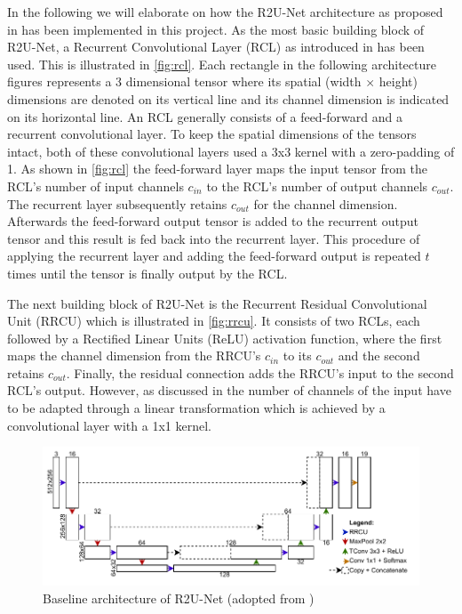 \documentclass{article}
\begin{document}
In the following we will elaborate on how the R2U-Net architecture as proposed 
in \autocite{R2UNet} has been implemented in this project. As the most basic 
building block of R2U-Net, a Recurrent Convolutional Layer
(RCL) as introduced in \autocite{RCNN} has been used. This is
illustrated in \autoref{fig:rcl}. Each rectangle in the following architecture 
figures represents a 3 dimensional tensor where its spatial (width $\times$ 
height) dimensions are denoted on its vertical line and its channel dimension 
is indicated on its horizontal line. An RCL generally consists of a 
feed-forward and a recurrent convolutional layer. To keep the spatial 
dimensions of the tensors intact, both of these convolutional layers used a 3x3 
kernel with a zero-padding of 1. As shown in \autoref{fig:rcl} the feed-forward 
layer maps the input tensor from the RCL's number of input channels $c_{in}$ to 
the 
RCL's number of output channels $c_{out}$. The recurrent layer subsequently 
retains $c_{out}$ for the channel dimension. Afterwards the feed-forward output 
tensor is added to the recurrent output tensor and this result is fed back into 
the recurrent layer. 
This procedure of applying the recurrent layer and adding the feed-forward 
output is repeated $t$ times until the tensor is finally output by the RCL. 
\autocite[4]{R2UNet}

The next building block of R2U-Net is the Recurrent Residual Convolutional Unit 
(RRCU) which is illustrated in \autoref{fig:rrcu}. It consists of two RCLs, 
each followed by a Rectified Linear Units (ReLU) activation function, where the 
first maps the channel dimension from the RRCU's $c_{in}$ to its $c_{out}$ and 
the second retains $c_{out}$. Finally, the residual connection adds the RRCU's 
input to the second RCL's output. However, as discussed in 
\autocite[3]{DeepResidual} the number of channels of the input have to be 
adapted through a linear transformation which is achieved by a convolutional 
layer with a 1x1 kernel. \autocite[4-5]{R2UNet}

\begin{figure}
	\centering
	\includegraphics[width=\textwidth]{R2UNet}
	\caption{Baseline architecture of R2U-Net (adopted from 
	\autocite[3]{R2UNet})}
	\label{fig:r2unet}
\end{figure}
\end{document}
